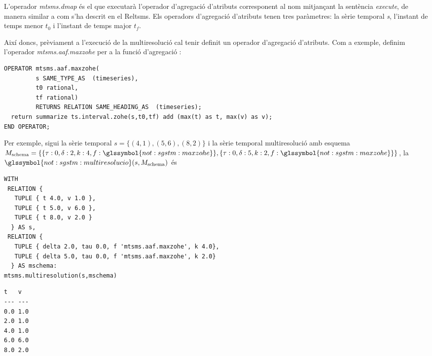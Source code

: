 L'operador \emph{mtsms.dmap} és el que executarà l'operador
d'agregació d'atributs corresponent al nom mitjançant la sentència
\emph{execute}, de manera similar a com s'ha descrit en el Reltsms.
Els operadors d'agregació d'atributs tenen tres paràmetres: la sèrie
temporal \emph{s}, l'instant de temps menor $t_0$ i l'instant de temps
major $t_f$.

Així doncs, prèviament a l'execució de la multiresolució cal tenir
definit un operador d'agregació d'atributs. Com a exemple, definim
l'operador \emph{mtsms.aaf.maxzohe} per a la funció d'agregació
:
\begin{lstlisting}[style=tutorialD]
OPERATOR mtsms.aaf.maxzohe(
         s SAME_TYPE_AS  (timeseries), 
         t0 rational, 
         tf rational)        
         RETURNS RELATION SAME_HEADING_AS  (timeseries);
  return summarize ts.interval.zohe(s,t0,tf) add (max(t) as t, max(v) as v);
END OPERATOR;
\end{lstlisting}


Per exemple, sigui la sèrie temporal $s=\{(4,1),(5,6),(8,2)\}$ i la
sèrie temporal multiresolució amb esquema $ M_{\text{schema}} = \{ \{
\tau : 0, \delta : 2, k: 4, f : \glssymbol{not:sgstm:maxzohe} \} , \{
\tau : 0, \delta : 5, k: 2, f :\glssymbol{not:sgstm:maxzohe} \} \}$,
la $\glssymbol{not:sgstm:multiresolucio}(s,M_{\text{schema}})$ és


\begin{lstlisting}[style=tutorialD]
WITH 
 RELATION {
   TUPLE { t 4.0, v 1.0 },
   TUPLE { t 5.0, v 6.0 },
   TUPLE { t 8.0, v 2.0 }
  } AS s,
 RELATION {
   TUPLE { delta 2.0, tau 0.0, f 'mtsms.aaf.maxzohe', k 4.0},
   TUPLE { delta 5.0, tau 0.0, f 'mtsms.aaf.maxzohe', k 2.0}
  } AS mschema:
mtsms.multiresolution(s,mschema)
\end{lstlisting}
\begin{lstlisting}[style=stdout]
 t   v 
--- ---
0.0 1.0
2.0 1.0
4.0 1.0
6.0 6.0
8.0 2.0
\end{lstlisting}










